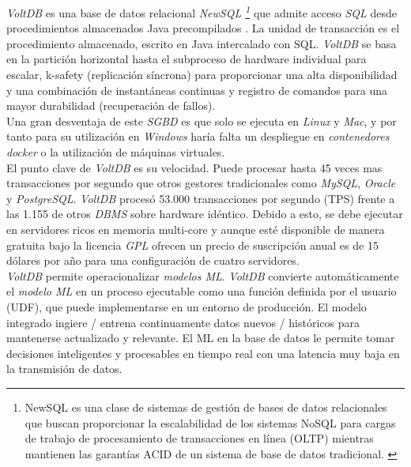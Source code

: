 \documentclass[3pt]{article}
\begin{document}
\emph{VoltDB} es una base de datos relacional \emph{NewSQL \footnote{NewSQL es una clase de sistemas de gestión de bases de datos relacionales que buscan proporcionar la escalabilidad de los sistemas NoSQL para cargas de trabajo de procesamiento de transacciones en línea (OLTP) mientras mantienen las garantías ACID de un sistema de base de datos tradicional. \cite{VOLT:3}}} que admite acceso \emph{SQL} desde procedimientos almacenados Java precompilados . La unidad de transacción es el procedimiento almacenado, escrito en Java intercalado con SQL. \emph{VoltDB} se basa en la partición horizontal hasta el subproceso de hardware individual para escalar, k-safety (replicación síncrona) para proporcionar una alta disponibilidad y una combinación de instantáneas continuas y registro de comandos para una mayor durabilidad (recuperación de fallos).\cite{VOLT:2}\\

Una gran desventaja de este \emph{SGBD} es que solo se ejecuta en \emph{Linux} y \emph{Mac}, y por tanto para su utilización en \emph{Windows} haría falta un despliegue en \emph{contenedores docker} o la utilización de máquinas virtuales. \cite{VOLT:4} \\

El punto clave de \emph{VoltDB} es su velocidad. Puede procesar hasta 45 veces mas transacciones por segundo que otros gestores tradicionales como \emph{MySQL}, \emph{Oracle} y \emph{PostgreSQL}. \emph{VoltDB} procesó 53.000 transacciones por segundo (TPS) frente a las 1.155 de otros \emph{DBMS} sobre hardware idéntico. \cite{VOLT:5} Debido a esto, se debe ejecutar en servidores ricos en memoria multi-core y aunque esté disponible de manera gratuita bajo la licencia \emph{GPL} ofrecen un precio de suscripción anual es de 15 dólares por año para una configuración de cuatro servidores.\\

\emph{VoltDB} permite operacionalizar \emph{modelos ML}. \emph{VoltDB} convierte automáticamente el \emph{modelo ML} en un proceso ejecutable como una función definida por el usuario (UDF), que puede implementarse en un entorno de producción. El modelo integrado ingiere / entrena continuamente datos nuevos / históricos para mantenerse actualizado y relevante. El ML en la base de datos le permite tomar decisiones inteligentes y procesables en tiempo real con una latencia muy baja en la transmisión de datos. \cite{VOLT:6}\\
\end{document}
